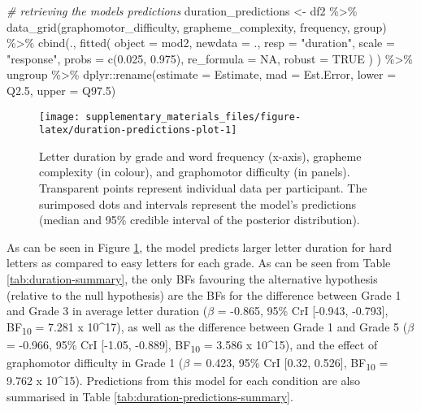 \documentclass[
  11pt,
  english,
  ,doc,floatsintext]{apa6}
\newenvironment{Shaded}{}{}
\newcommand{\AttributeTok}[1]{\textcolor[rgb]{0.49,0.56,0.16}{#1}}
\newcommand{\CommentTok}[1]{\textcolor[rgb]{0.38,0.63,0.69}{\textit{#1}}}
\newcommand{\ConstantTok}[1]{\textcolor[rgb]{0.53,0.00,0.00}{#1}}
\newcommand{\FloatTok}[1]{\textcolor[rgb]{0.25,0.63,0.44}{#1}}
\newcommand{\FunctionTok}[1]{\textcolor[rgb]{0.02,0.16,0.49}{#1}}
\newcommand{\NormalTok}[1]{#1}
\newcommand{\OtherTok}[1]{\textcolor[rgb]{0.00,0.44,0.13}{#1}}
\newcommand{\SpecialCharTok}[1]{\textcolor[rgb]{0.25,0.44,0.63}{#1}}
\newcommand{\StringTok}[1]{\textcolor[rgb]{0.25,0.44,0.63}{#1}}
\begin{document}
\begin{Shaded}
\begin{Highlighting}[]
\CommentTok{\# retrieving the model\textquotesingle{}s predictions}
\NormalTok{duration\_predictions }\OtherTok{\textless{}{-}}\NormalTok{ df2 }\SpecialCharTok{\%\textgreater{}\%}
    \FunctionTok{data\_grid}\NormalTok{(graphomotor\_difficulty, grapheme\_complexity, frequency, group) }\SpecialCharTok{\%\textgreater{}\%}
    \FunctionTok{cbind}\NormalTok{(., }\FunctionTok{fitted}\NormalTok{(}
        \AttributeTok{object =}\NormalTok{ mod2, }\AttributeTok{newdata =}\NormalTok{ ., }\AttributeTok{resp =} \StringTok{"duration"}\NormalTok{,}
        \AttributeTok{scale =} \StringTok{"response"}\NormalTok{, }\AttributeTok{probs =} \FunctionTok{c}\NormalTok{(}\FloatTok{0.025}\NormalTok{, }\FloatTok{0.975}\NormalTok{),}
        \AttributeTok{re\_formula =} \ConstantTok{NA}\NormalTok{, }\AttributeTok{robust =} \ConstantTok{TRUE}
\NormalTok{        ) ) }\SpecialCharTok{\%\textgreater{}\%}
\NormalTok{    ungroup }\SpecialCharTok{\%\textgreater{}\%}
\NormalTok{    dplyr}\SpecialCharTok{::}\FunctionTok{rename}\NormalTok{(}\AttributeTok{estimate =}\NormalTok{ Estimate, }\AttributeTok{mad =}\NormalTok{ Est.Error, }\AttributeTok{lower =}\NormalTok{ Q2}\FloatTok{.5}\NormalTok{, }\AttributeTok{upper =}\NormalTok{ Q97}\FloatTok{.5}\NormalTok{)}
\end{Highlighting}
\end{Shaded}

\begin{figure}[!htb]

{\centering \texttt{[image: supplementary\_materials\_files/figure-latex/duration-predictions-plot-1]} 

}

\caption{Letter duration by grade and word frequency (x-axis), grapheme complexity (in colour), and graphomotor difficulty (in panels). Transparent points represent individual data per participant. The surimposed dots and intervals represent the model's predictions (median and 95\% credible interval of the posterior distribution).}\label{fig:duration-predictions-plot}
\end{figure}

As can be seen in Figure \ref{fig:duration-predictions-plot}, the model predicts larger letter duration for hard letters as compared to easy letters for each grade. As can be seen from Table \ref{tab:duration-summary}, the only BFs favouring the alternative hypothesis (relative to the null hypothesis) are the BFs for the difference between Grade 1 and Grade 3 in average letter duration (\(\beta\) = -0.865, 95\% CrI {[}-0.943, -0.793{]}, BF\textsubscript{10} = 7.281 x 10\^{}17), as well as the difference between Grade 1 and Grade 5 (\(\beta\) = -0.966, 95\% CrI {[}-1.05, -0.889{]}, BF\textsubscript{10} = 3.586 x 10\^{}15), and the effect of graphomotor difficulty in Grade 1 (\(\beta\) = 0.423, 95\% CrI {[}0.32, 0.526{]}, BF\textsubscript{10} = 9.762 x 10\^{}15). Predictions from this model for each condition are also summarised in Table \ref{tab:duration-predictions-summary}.
\end{document}
